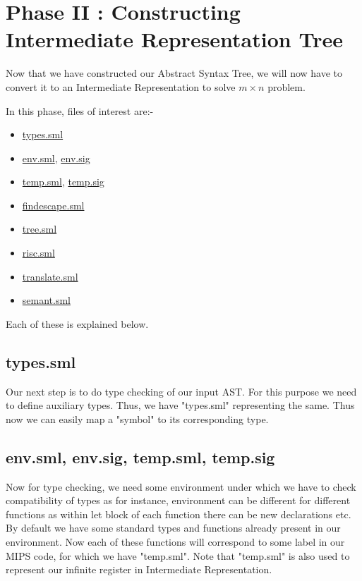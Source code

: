 \chapter{Phase II : Constructing Intermediate Representation Tree}

Now that we have constructed our Abstract Syntax Tree, we will now have to convert it to an Intermediate Representation to solve $m \times n$ problem.

In this phase, files of interest are:-

\begin{itemize}
  \item \href{\git types.sml}{types.sml}
  \item \href{\git env.sml}{env.sml}, \href{\git env.sig}{env.sig}
  \item \href{\git temp.sml}{temp.sml}, \href{\git temp.sig}{temp.sig}
  \item \href{\git findescape.sml}{findescape.sml}
  \item \href{\git tree.sml}{tree.sml}
  \item \href{\git risc.sml}{risc.sml}
  \item \href{\git translate.sml}{translate.sml}
  \item \href{\git semant.sml}{semant.sml}
\end{itemize}

Each of these is explained below.

\section{types.sml}

Our next step is to do type checking of our input AST. For this purpose we need to define auxiliary types. Thus, we have "types.sml" representing the same. Thus now we can easily map a "symbol" to its corresponding type.

\section{env.sml, env.sig, temp.sml, temp.sig}

Now for type checking, we need some environment under which we have to check compatibility of types as for instance, environment can be different for different functions as within let block of each function there can be new declarations etc. By default we have some standard types and functions already present in our environment. Now each of these functions will correspond to some label in our MIPS code, for which we have "temp.sml". Note that "temp.sml" is also used to represent our infinite register in Intermediate Representation.

